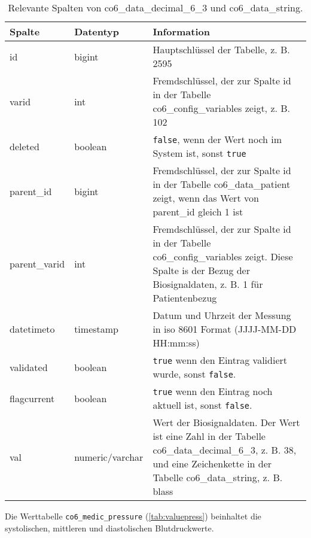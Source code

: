\begin{longtable}{|l|l|p{7cm}|}
	\caption[Relevante Spalten von co6\_data\_decimal\_6\_3 und \\ co6\_data\_string]{Relevante Spalten von co6\_data\_decimal\_6\_3 und co6\_data\_string.}
	\label{tab:valuetab}
	\endfirsthead
		\hline
		\rowcolor{lightgray} Spalte & Datentyp & Information \\ \hline
		id & bigint & Hauptschlüssel der Tabelle, z. B. 2595 \\ \hline
		varid & int & Fremdschlüssel, der zur Spalte id in der Tabelle co6\_config\_variables zeigt, z. B. 102 \\ \hline
		deleted & boolean & \texttt{false}, wenn der Wert noch im System ist, sonst \texttt{true} \\ \hline
		parent\_id & bigint & Fremdschlüssel, der zur Spalte id in der Tabelle co6\_data\_patient zeigt, wenn das Wert von parent\_id gleich 1 ist \\ \hline
		parent\_varid & int & Fremdschlüssel, der zur Spalte id in der Tabelle co6\_config\_variables zeigt. Diese Spalte is der Bezug der Biosignaldaten, z. B. 1 für Patientenbezug \\ \hline
		datetimeto & timestamp & Datum und Uhrzeit der Messung in \acs{iso} 8601 Format (JJJJ-MM-DD HH:mm:ss)\\ \hline
		validated & boolean & \texttt{true} wenn den Eintrag validiert wurde, sonst \texttt{false}. \\ \hline
		flagcurrent & boolean & \texttt{true} wenn den Eintrag noch aktuell ist, sonst \texttt{false}. \\ \hline
		val & numeric/varchar & Wert der Biosignaldaten. Der Wert ist eine Zahl in der Tabelle co6\_data\_decimal\_6\_3, z. B. 38, und eine Zeichenkette in der Tabelle co6\_data\_string, z. B. blass \\ \hline
\end{longtable}

Die Werttabelle \texttt{co6\_medic\_pressure} (\ref{tab:valuepress}) beinhaltet die systolischen, mittleren und diastolischen Blutdruckwerte.

